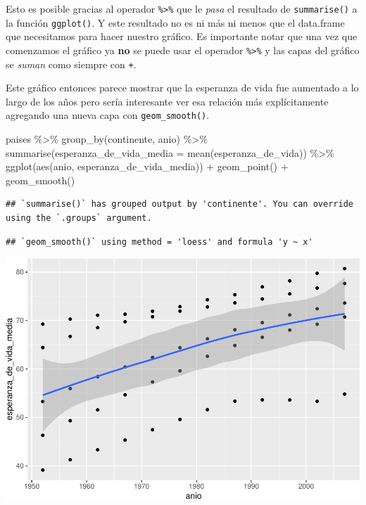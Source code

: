 \documentclass[
  openany]{book}
\newenvironment{Shaded}{\begin{snugshade}}{\end{snugshade}}
\newcommand{\AttributeTok}[1]{\textcolor[rgb]{0.77,0.63,0.00}{#1}}
\newcommand{\FunctionTok}[1]{\textcolor[rgb]{0.00,0.00,0.00}{#1}}
\newcommand{\NormalTok}[1]{#1}
\newcommand{\SpecialCharTok}[1]{\textcolor[rgb]{0.00,0.00,0.00}{#1}}
\begin{document}
Esto es posible gracias al operador \texttt{\%\textgreater{}\%} que le \emph{pasa} el resultado de \texttt{summarise()} a la función \texttt{ggplot()}.
Y este resultado no es ni más ni menos que el data.frame que necesitamos para hacer nuestro gráfico.
Es importante notar que una vez que comenzamos el gráfico ya \textbf{no} se puede usar el operador \texttt{\%\textgreater{}\%} y las capas del gráfico se \emph{suman} como siempre con \texttt{+}.

Este gráfico entonces parece mostrar que la esperanza de vida fue aumentado a lo largo de los años pero sería interesante ver esa relación más explícitamente agregando una nueva capa con \texttt{geom\_smooth()}.

\begin{Shaded}
\begin{Highlighting}[]
\NormalTok{paises }\SpecialCharTok{\%\textgreater{}\%} 
  \FunctionTok{group\_by}\NormalTok{(continente, anio) }\SpecialCharTok{\%\textgreater{}\%} 
  \FunctionTok{summarise}\NormalTok{(}\AttributeTok{esperanza\_de\_vida\_media =} \FunctionTok{mean}\NormalTok{(esperanza\_de\_vida)) }\SpecialCharTok{\%\textgreater{}\%} 
  \FunctionTok{ggplot}\NormalTok{(}\FunctionTok{aes}\NormalTok{(anio, esperanza\_de\_vida\_media)) }\SpecialCharTok{+}  
  \FunctionTok{geom\_point}\NormalTok{() }\SpecialCharTok{+}
  \FunctionTok{geom\_smooth}\NormalTok{()}
\end{Highlighting}
\end{Shaded}

\begin{verbatim}
## `summarise()` has grouped output by 'continente'. You can override using the `.groups` argument.
\end{verbatim}

\begin{verbatim}
## `geom_smooth()` using method = 'loess' and formula 'y ~ x'
\end{verbatim}

\begin{center}\includegraphics[width=1\linewidth]{DT6_files/figure-latex/unnamed-chunk-55-1} \end{center}
\end{document}
